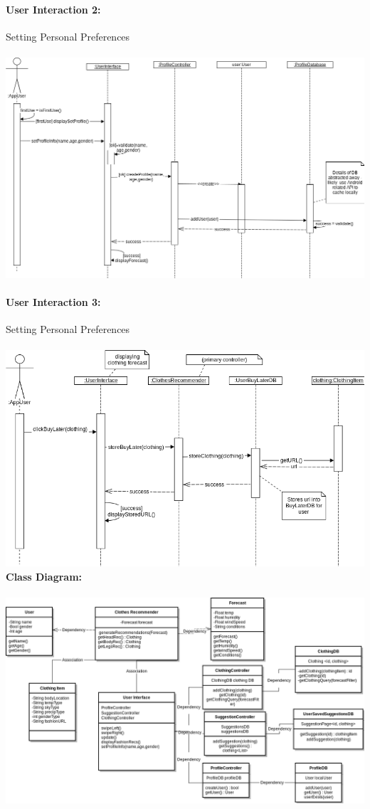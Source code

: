 \documentclass[12pt,a4paper]{article}
\begin{document}
\paragraph{User Interaction 2:} Setting Personal Preferences\\\\
\includegraphics[scale=0.45]{uc2_settingpersonalprefssequence.png}

\pagebreak
\paragraph{User Interaction 3:} Setting Personal Preferences\\\\
\includegraphics[scale=0.5]{uc_03_savefashionsuggestion.png}\\



\noindent\textbf{Class Diagram:} \\\\
\includegraphics[scale=0.45]{classdiagram.png}
\end{document}
